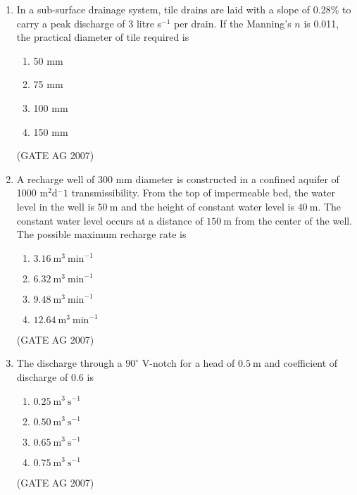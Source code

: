 \documentclass[journal,12pt,onecolumn]{IEEEtran}
\theoremstyle{remark}
\begin{document}
\begin{enumerate}
\begin{multicols}{4}
\begin{enumerate}
\item 21110 m$^3$
\item 32220 m$^3$
\item 42220 m$^3$
\item 59340 m$^3$
\end{enumerate}
\end{multicols}
\hfill(GATE AG 2007)

\item In a sub-surface drainage system, tile drains are laid with a slope of 0.28\% to carry a peak discharge of 3 litre s$^{-1}$ per drain. If the Manning's $n$ is 0.011, the practical diameter of tile required is

\begin{multicols}{4}
\begin{enumerate}
\item 50 mm
\item 75 mm
\item 100 mm
\item 150 mm
\end{enumerate}
\end{multicols}

\hfill(GATE AG 2007)

\item A recharge well of 300 mm diameter is constructed in a confined aquifer of 1000 m${^2}$d${^-1}$ transmissibility. From the top of impermeable bed, the water level in the well is $50\ \text{m}$ and the height of constant water level is $40\ \text{m}$. The constant water level occurs at a distance of $150\ \text{m}$ from the center of the well. The possible maximum recharge rate is

\begin{multicols}{4}
\begin{enumerate}
\item $3.16\ \text{m}^3\ \text{min}^{-1}$
\item $6.32\ \text{m}^3\ \text{min}^{-1}$
\item $9.48\ \text{m}^3\ \text{min}^{-1}$
\item $12.64\ \text{m}^3\ \text{min}^{-1}$
\end{enumerate}
\end{multicols}
\hfill(GATE AG 2007)


\item The discharge through a $90^\circ$ V-notch for a head of $0.5\ \text{m}$ and coefficient of discharge of $0.6$ is

\begin{multicols}{4}
\begin{enumerate}
\item $0.25\ \text{m}^3\ \text{s}^{-1}$
\item $0.50\ \text{m}^3\ \text{s}^{-1}$
\item $0.65\ \text{m}^3\ \text{s}^{-1}$
\item $0.75\ \text{m}^3\ \text{s}^{-1}$
\end{enumerate}
\end{multicols}
\hfill(GATE AG 2007)



\end{enumerate}
\end{document}
